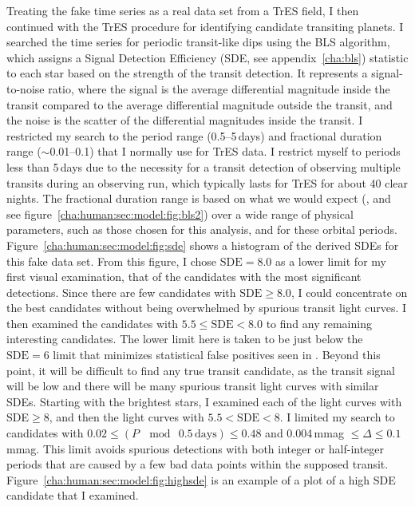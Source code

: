 Treating the fake time series as a real data set from a TrES field, I then continued with the TrES procedure for identifying candidate transiting planets.
I searched the time series for periodic transit-like dips using the BLS algorithm, which assigns a Signal Detection Efficiency (SDE, see appendix~\ref{cha:bls}) statistic to each star based on the strength of the transit detection.
It represents a signal-to-noise ratio, where the signal is the average differential magnitude inside the transit compared to the average differential magnitude outside the transit, and the noise is the scatter of the differential magnitudes inside the transit.
I restricted my search to the period range (0.5--5\,days) and fractional duration range ($\sim$0.01--0.1) that I normally use for TrES data.
I restrict myself to periods less than 5\,days due to the necessity for a transit detection of observing multiple transits during an observing run, which typically lasts for TrES for about 40 clear nights.
The fractional duration range is based on what we would expect (\citealp*{Defay_Deleuil_Barge:aa:2001a}, and see figure~\ref{cha:human:sec:model:fig:bls2}) over a wide range of physical parameters, such as those chosen for this analysis, and for these orbital periods. Figure~\ref{cha:human:sec:model:fig:sde} shows a histogram of the derived SDEs for this fake data set.
From this figure, I chose $\mathrm{SDE}=8.0$ as a lower limit for my first visual examination, that of the candidates with the most significant detections.
Since there are few candidates with $\mathrm{SDE}\geq8.0$, I could concentrate on the best candidates without being overwhelmed by spurious transit light curves.
I then examined the candidates with $5.5 \leq \mathrm{SDE} < 8.0$ to find any remaining interesting candidates.
The lower limit here is taken to be just below the $\mathrm{SDE}=6$ limit that minimizes statistical false positives seen in \citet{Kovacs_Zucker_Mazeh:aa:2002a}.
Beyond this point, it will be difficult to find any true transit candidate, as the transit signal will be low and there will be many spurious transit light curves with similar SDEs.
Starting with the brightest stars, I examined each of the light curves with SDE$\geq8$, and then the light curves with $5.5<\mathrm{SDE}<8$.
I limited my search to candidates with $0.02 \leq (P\ \mod\ 0.5\,\mathrm{days})\leq 0.48$ and 0.004\,mmag $\leq \Delta \leq 0.1$\,mmag.
This limit avoids spurious detections with both integer or half-integer periods that are caused by a few bad data points within the supposed transit. Figure~\ref{cha:human:sec:model:fig:highsde} is an example of a plot of a high SDE candidate that I examined.

